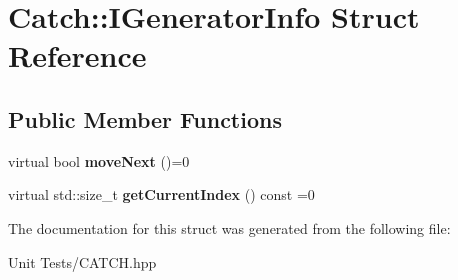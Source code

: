 \hypertarget{structCatch_1_1IGeneratorInfo}{}\section{Catch\+:\+:I\+Generator\+Info Struct Reference}
\label{structCatch_1_1IGeneratorInfo}
\subsection*{Public Member Functions}
\begin{DoxyCompactItemize}
\item 
virtual bool {\bfseries move\+Next} ()=0\hypertarget{structCatch_1_1IGeneratorInfo_a2b86711ca7009903edfe27ed62b515ef}{}\label{structCatch_1_1IGeneratorInfo_a2b86711ca7009903edfe27ed62b515ef}

\item 
virtual std\+::size\+\_\+t {\bfseries get\+Current\+Index} () const =0\hypertarget{structCatch_1_1IGeneratorInfo_a6a0dca712d31f6849fd9447b1344673a}{}\label{structCatch_1_1IGeneratorInfo_a6a0dca712d31f6849fd9447b1344673a}

\end{DoxyCompactItemize}


The documentation for this struct was generated from the following file\+:\begin{DoxyCompactItemize}
\item 
Unit Tests/C\+A\+T\+C\+H.\+hpp\end{DoxyCompactItemize}
